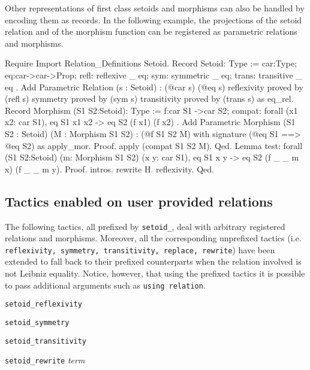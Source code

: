 Other representations of first class setoids and morphisms can also
be handled by encoding them as records. In the following example,
the projections of the setoid relation and of the morphism function 
can be registered as parametric relations and morphisms.
\begin{cscexample}

\begin{coq_example*}
Require Import Relation_Definitions Setoid.
Record Setoid: Type :=
{ car:Type;
  eq:car->car->Prop;
  refl: reflexive _ eq;
  sym: symmetric _ eq;
  trans: transitive _ eq
}.
Add Parametric Relation (s : Setoid) : (@car s) (@eq s)
 reflexivity proved by (refl s)
 symmetry proved by (sym s)
 transitivity proved by (trans s) as eq_rel.
Record Morphism (S1 S2:Setoid): Type :=
{ f:car S1 ->car S2;
  compat: forall (x1 x2: car S1), eq S1 x1 x2 -> eq S2 (f x1) (f x2) }.
Add Parametric Morphism (S1 S2 : Setoid) (M : Morphism S1 S2) :
 (@f S1 S2 M) with signature (@eq S1 ==> @eq S2) as apply_mor.
Proof. apply (compat S1 S2 M). Qed.
Lemma test: forall (S1 S2:Setoid) (m: Morphism S1 S2)
 (x y: car S1), eq S1 x y -> eq S2 (f _ _ m x) (f _ _ m y).
Proof. intros. rewrite H. reflexivity. Qed.
\end{coq_example*}
\end{cscexample}

\subsection{Tactics enabled on user provided relations}
\label{setoidtactics}
The following tactics, all prefixed by \texttt{setoid\_}, 
deal with arbitrary
registered relations and morphisms. Moreover, all the corresponding unprefixed
tactics (i.e. \texttt{reflexivity, symmetry, transitivity, replace, rewrite})
have been extended to fall back to their prefixed counterparts when
the relation involved is not Leibniz equality. Notice, however, that using
the prefixed tactics it is possible to pass additional arguments such as
\texttt{using relation}.
\medskip

\texttt{setoid\_reflexivity}

\texttt{setoid\_symmetry} 

\texttt{setoid\_transitivity}

\texttt{setoid\_rewrite}  \textit{term}
~ ~

